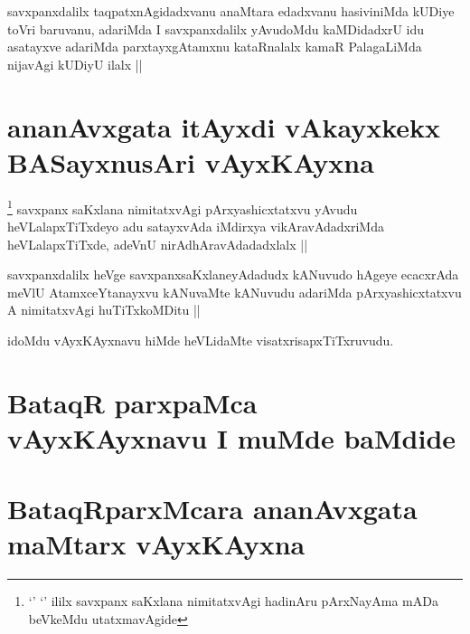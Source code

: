 
\begin{artha}
savxpanxdalilx taqpatxnAgidadxvanu anaMtara edadxvanu hasiviniMda kUDiye toVri baruvanu, adariMda I savxpanxdalilx yAvudoMdu kaMDidadxrU idu asatayxve adariMda parxtayxgAtamxnu kataRnalalx kamaR PalagaLiMda nijavAgi kUDiyU ilalx ||
\end{artha}

\section*{ananAvxgata itAyxdi vAkayxkekx BASayxnusAri vAyxKAyxna}


\begin{artha}
\footnote{`\stext' `\stext' ililx savxpanx saKxlana nimitatxvAgi hadinAru pArxNayAma mADa beVkeMdu utatxmavAgide}
savxpanx saKxlana nimitatxvAgi pArxyashicxtatxvu yAvudu heVLalapxTiTxdeyo adu satayxvAda iMdirxya vikAravAdadxriMda heVLalapxTiTxde, adeVnU nirAdhAravAdadadxlalx ||
\end{artha}


\begin{artha}
savxpanxdalilx heVge savxpanxsaKxlaneyAdadudx kANuvudo hAgeye ecacxrAda meVlU AtamxceYtanayxvu kANuvaMte kANuvudu adariMda pArxyashicxtatxvu A nimitatxvAgi huTiTxkoMDitu ||
\end{artha}


\begin{artha}
idoMdu vAyxKAyxnavu hiMde heVLidaMte visatxrisapxTiTxruvudu.
\end{artha}

\section*{BataqR parxpaMca vAyxKAyxnavu I muMde baMdide}


\section*{BataqRparxMcara ananAvxgata maMtarx vAyxKAyxna}

